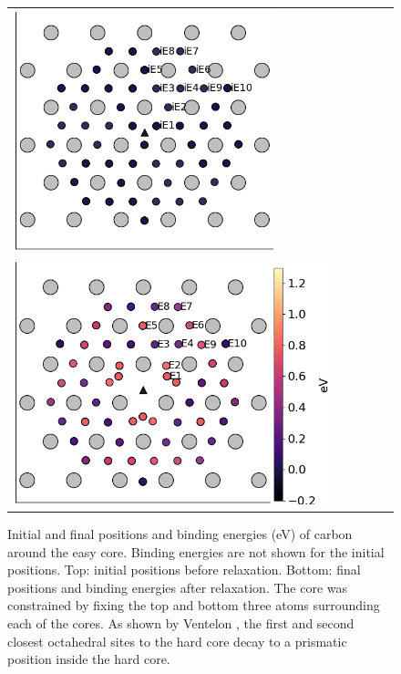 \documentclass[a4paper,11pt]{article}
\begin{document}
\begin{figure}	
    \begin{tabular}{l}
 	          \includegraphics[width=0.7\textwidth]{../Images/easy_core_fe_C_initial_positioning.png}  \\
 	          \includegraphics[width=0.85\textwidth]{../Images/easy_core_fe_C_positioning_energies_e10_label.png}  \\

     	     \end{tabular}		
\caption{ Initial and final positions and binding energies (eV) of carbon around the easy core. Binding energies are not shown for the initial positions. Top: initial positions before relaxation. Bottom: final positions and binding energies after relaxation. The core was constrained by fixing the top and bottom three atoms surrounding each of the cores. As shown by Ventelon \cite{Ventelon2015}, the first and second closest octahedral sites to the hard core decay to a prismatic position inside the hard core. }
\label{easybindingenergydist}
   \end{figure}
\end{document}
